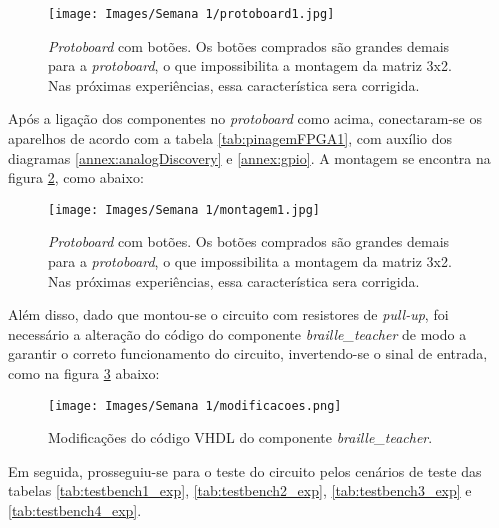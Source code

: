 \documentclass[amsmath,amssymb,floatfix]{report}
\begin{document}
\begin{figure}[H]
\centering
\texttt{[image: Images/Semana 1/protoboard1.jpg]} 
    \caption{\textit{Protoboard} com botões. Os botões comprados são grandes demais para a \textit{protoboard}, o que impossibilita a montagem da matriz 3x2. Nas próximas experiências, essa característica sera corrigida.}
    \label{fig:protoboard1}
\end{figure}

Após a ligação dos componentes no \textit{protoboard} como acima, conectaram-se os aparelhos de acordo com a tabela \ref{tab:pinagemFPGA1}, com auxílio dos diagramas \ref{annex:analogDiscovery} e \ref{annex:gpio}. A montagem se encontra na figura \ref{fig:montagem1}, como abaixo:

\begin{figure}[H]
\centering
\texttt{[image: Images/Semana 1/montagem1.jpg]} 
    \caption{\textit{Protoboard} com botões. Os botões comprados são grandes demais para a \textit{protoboard}, o que impossibilita a montagem da matriz 3x2. Nas próximas experiências, essa característica sera corrigida.}
    \label{fig:montagem1}
\end{figure}

Além disso, dado que montou-se o circuito com resistores de \textit{pull-up}, foi necessário a alteração do código do componente \textit{braille\_teacher} de modo a garantir o correto funcionamento do circuito, invertendo-se o sinal de entrada, como na figura \ref{fig:modificacoes} abaixo:

\begin{figure}[H]
\centering
\texttt{[image: Images/Semana 1/modificacoes.png]} 
    \caption{Modificações do código VHDL do componente \textit{braille\_teacher}.}
    \label{fig:modificacoes}
\end{figure}


Em seguida, prosseguiu-se para o teste do circuito pelos cenários de teste das tabelas \ref{tab:testbench1_exp}, \ref{tab:testbench2_exp}, \ref{tab:testbench3_exp} e \ref{tab:testbench4_exp}.
\end{document}
